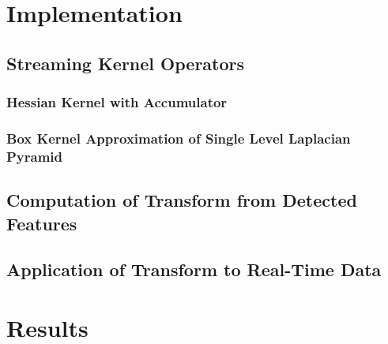 \documentclass{article}
\begin{document}
\section{Implementation}

\subsection{Streaming Kernel Operators}

\subsubsection{Hessian Kernel with Accumulator}

\subsubsection{Box Kernel Approximation of Single Level Laplacian Pyramid}

\subsection{Computation of Transform from Detected Features}

\subsection{Application of Transform to Real-Time Data}

\section{Results}

\pagebreak



\end{document}

